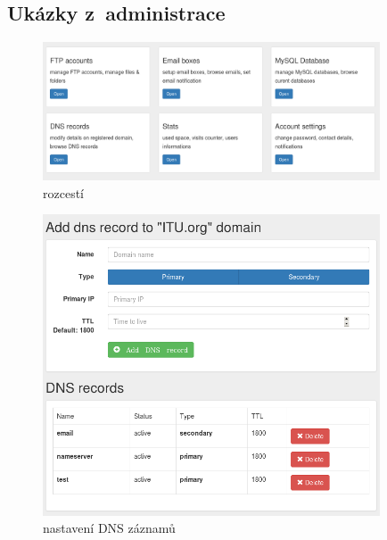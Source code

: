 \documentclass[11pt,a4paper]{article}
\begin{document}
    \subsection{Ukázky z~administrace}

      \begin{figure}[ht]
        \begin{center}
          \includegraphics[width=10cm]{dashboard}
          \caption{rozcestí}
        \end{center}
      \end{figure}

      \begin{figure}[ht]
        \begin{center}
          \includegraphics[width=10cm]{dns}
          \caption{nastavení DNS záznamů}
          \label{nastaveni-dns}
        \end{center}
      \end{figure}
\end{document}
